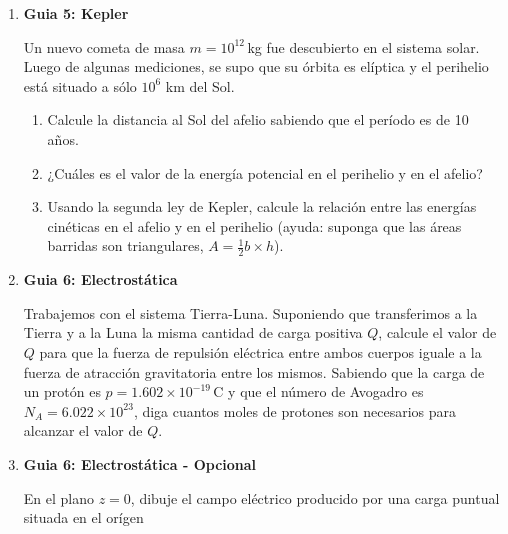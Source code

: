 \documentclass[a4paper,12pt]{article}
\begin{document}
\begin{enumerate}
  \item {\bf{Guia 5: Kepler}}

    Un nuevo cometa de masa $m=10^{12}$\,kg fue descubierto en el sistema
    solar. Luego de algunas mediciones, se supo que su órbita es elíptica y el
    perihelio está situado a sólo $10^6$ km del Sol.
    
    \begin{enumerate} 
      \item Calcule la distancia al Sol del afelio sabiendo que el período es
        de 10 años.
      \item ¿Cuáles es el valor de la energía potencial en el perihelio y en el
        afelio?
      \item Usando la segunda ley de Kepler, calcule la relación entre las
        energías cinéticas en el afelio y en el perihelio (ayuda: suponga que
        las áreas barridas son triangulares, $A=\frac{1}{2} b \times h$).
    \end{enumerate}


  \item {\bf{Guia 6: Electrostática}}

    Trabajemos con el sistema Tierra-Luna. Suponiendo que transferimos a la
    Tierra y a la Luna la misma cantidad de carga positiva $Q$, calcule el
    valor de $Q$ para que la fuerza de repulsión eléctrica entre ambos cuerpos
    iguale a la fuerza de atracción gravitatoria entre los mismos. Sabiendo que
    la carga de un protón es $p=1.602\times10^{-19}$\,C y que el número de
    Avogadro es $N_A=6.022\times 10^{23}$, diga cuantos moles de protones son
    necesarios para alcanzar el valor de $Q$.

  \item {\bf{Guia 6: Electrostática - Opcional}}

    En el plano $z=0$, dibuje el campo eléctrico producido por una carga
    puntual situada en el orígen

\end{enumerate}
\end{document}
